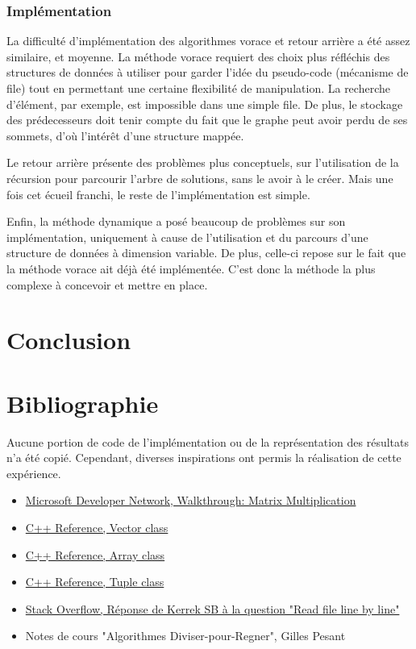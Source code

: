 \documentclass[10pt,a4paper]{article}
\begin{document}
\subsubsection{Implémentation}

La difficulté d'implémentation des algorithmes vorace et retour arrière a été assez similaire, et moyenne. La méthode vorace requiert des choix plus réfléchis des structures de données à utiliser pour garder l'idée du pseudo-code (mécanisme de file) tout en permettant une certaine flexibilité de manipulation. La recherche d'élément, par exemple, est impossible dans une simple file. De plus, le stockage des prédecesseurs doit tenir compte du fait que le graphe peut avoir perdu de ses sommets, d'où l'intérêt d'une structure mappée.

Le retour arrière présente des problèmes plus conceptuels, sur l'utilisation de la récursion pour parcourir l'arbre de solutions, sans le avoir à le créer. Mais une fois cet écueil franchi, le reste de l'implémentation est simple.

Enfin, la méthode dynamique a posé beaucoup de problèmes sur son implémentation, uniquement à cause de l'utilisation et du parcours d'une structure de données à dimension variable. De plus, celle-ci repose sur le fait que la méthode vorace ait déjà été implémentée. C'est donc la méthode la plus complexe à concevoir et mettre en place.

\section{Conclusion}

\section{Bibliographie}

Aucune portion de code de l'implémentation ou de la représentation des résultats n'a été copié. Cependant, diverses inspirations ont permis la réalisation de cette expérience.

\begin{itemize}
	\item \href{http://msdn.microsoft.com/en-us/library/hh873134.aspx}{Microsoft Developer Network, Walkthrough: Matrix Multiplication}
	\item \href{http://www.cplusplus.com/reference/vector/vector/}{C++ Reference, Vector class}
	\item \href{http://www.cplusplus.com/doc/tutorial/arrays/}{C++ Reference, Array class}
	\item \href{http://www.cplusplus.com/reference/tuple/tuple/}{C++ Reference, Tuple class}
	\item \href{http://stackoverflow.com/questions/7868936/c-read-file-line-by-line}{Stack Overflow, Réponse de Kerrek SB à la question "Read file line by line"}
	\item Notes de cours "Algorithmes Diviser-pour-Regner", Gilles Pesant
\end{itemize}
\end{document}
